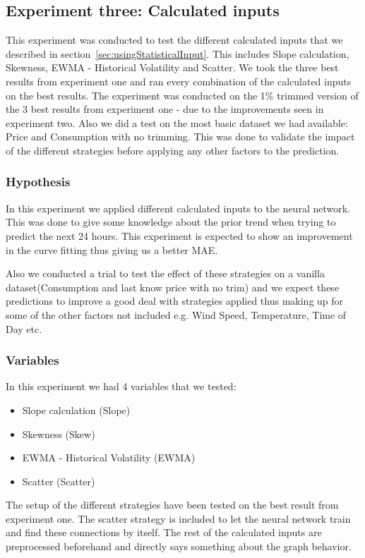 \newpage
\subsection{Experiment three: Calculated inputs}
\label{sec:priceExperimentThree}
This experiment was conducted to test the different calculated inputs that we described in section~\ref{sec:usingStatisticalInput}. This includes Slope calculation, Skewness, EWMA - Historical Volatility and Scatter. We took the three best results from experiment one and ran every combination of the calculated inputs on the best results. The experiment was conducted on the 1\% trimmed version of the 3 best results from experiment one - due to the improvements seen in experiment two. Also we did a test on the most basic dataset we had available: Price and Consumption with no trimming. This was done to validate the impact of the different strategies before applying any other factors to the prediction.

\subsubsection{Hypothesis}
In this experiment we applied different calculated inputs to the neural network. This was done to give some knowledge about the prior trend when trying to predict the next 24 hours. This experiment is expected to show an improvement in the curve fitting thus giving us a better MAE.

Also we conducted a trial to test the effect of these strategies on a vanilla dataset(Consumption and last know price with no trim) and we expect these predictions to improve a good deal with strategies applied thus making up for some of the other factors not included e.g. Wind Speed, Temperature, Time of Day etc.

\subsubsection{Variables}
In this experiment we had 4 variables that we tested:
\begin{itemize}
	\item Slope calculation (Slope)
	\item Skewness (Skew)
	\item EWMA - Historical Volatility (EWMA)
	\item Scatter (Scatter)
\end{itemize}

The setup of the different strategies have been tested on the best result from experiment one. The scatter strategy is included to let the neural network train and find these connections by itself. The rest of the calculated inputs are preprocessed beforehand and directly says something about the graph behavior.

